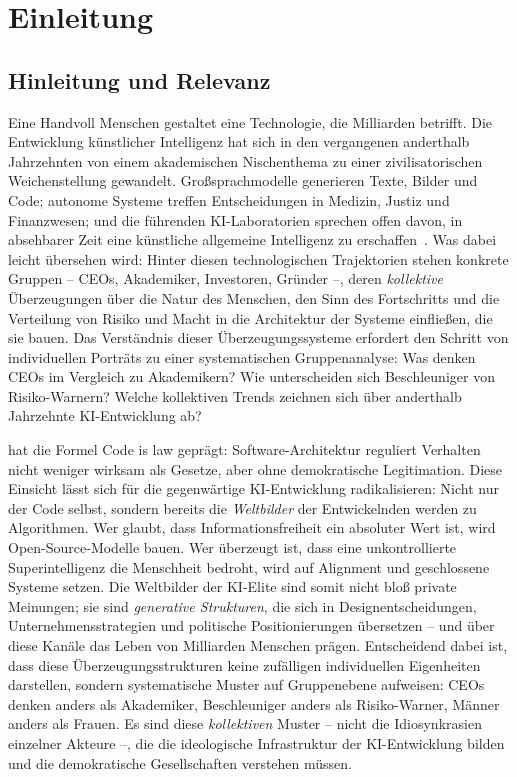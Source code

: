 \documentclass[12pt,a4paper]{article}
\begin{document}
\section{Einleitung}
\label{sec:einleitung}

\subsection{Hinleitung und Relevanz}
\label{sec:einleitung:relevanz}

Eine Handvoll Menschen gestaltet eine Technologie, die Milliarden betrifft. Die Entwicklung künstlicher Intelligenz hat sich in den vergangenen anderthalb Jahrzehnten von einem akademischen Nischenthema zu einer zivilisatorischen Weichenstellung gewandelt. Großsprachmodelle generieren Texte, Bilder und Code; autonome Systeme treffen Entscheidungen in Medizin, Justiz und Finanzwesen; und die führenden KI-Laboratorien sprechen offen davon, in absehbarer Zeit eine künstliche allgemeine Intelligenz zu erschaffen~\citep{OpenAI2023Charter, AnthropicCoreViews2023, Bengio2024}. Was dabei leicht übersehen wird: Hinter diesen technologischen Trajektorien stehen konkrete Gruppen -- CEOs, Akademiker, Investoren, Gründer --, deren \emph{kollektive} Überzeugungen über die Natur des Menschen, den Sinn des Fortschritts und die Verteilung von Risiko und Macht in die Architektur der Systeme einfließen, die sie bauen. Das Verständnis dieser Überzeugungssysteme erfordert den Schritt von individuellen Porträts zu einer systematischen Gruppenanalyse: Was denken CEOs im Vergleich zu Akademikern? Wie unterscheiden sich Beschleuniger von Risiko-Warnern? Welche kollektiven Trends zeichnen sich über anderthalb Jahrzehnte KI-Entwicklung ab?

\citet{Lessig1999} hat die Formel \glqq Code is law\grqq{} geprägt: Software-Architektur reguliert Verhalten nicht weniger wirksam als Gesetze, aber ohne demokratische Legitimation. Diese Einsicht lässt sich für die gegenwärtige KI-Entwicklung radikalisieren: Nicht nur der Code selbst, sondern bereits die \emph{Weltbilder} der Entwickelnden werden zu Algorithmen. Wer glaubt, dass Informationsfreiheit ein absoluter Wert ist, wird Open-Source-Modelle bauen. Wer überzeugt ist, dass eine unkontrollierte Superintelligenz die Menschheit bedroht, wird auf Alignment und geschlossene Systeme setzen. Die Weltbilder der KI-Elite sind somit nicht bloß private Meinungen; sie sind \emph{generative Strukturen}, die sich in Designentscheidungen, Unternehmensstrategien und politische Positionierungen übersetzen -- und über diese Kanäle das Leben von Milliarden Menschen prägen. Entscheidend dabei ist, dass diese Überzeugungsstrukturen keine zufälligen individuellen Eigenheiten darstellen, sondern systematische Muster auf Gruppenebene aufweisen: CEOs denken anders als Akademiker, Beschleuniger anders als Risiko-Warner, Männer anders als Frauen. Es sind diese \emph{kollektiven} Muster -- nicht die Idiosynkrasien einzelner Akteure --, die die ideologische Infrastruktur der KI-Entwicklung bilden und die demokratische Gesellschaften verstehen müssen.
\end{document}
